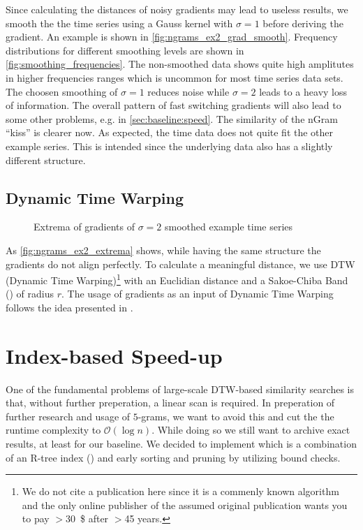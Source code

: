 Since calculating the distances of noisy gradients may lead to useless results, we smooth the the time series using a Gauss kernel with $\sigma = 1$ before deriving the gradient. An example is shown in \autoref{fig:ngrams_ex2_grad_smooth}. Frequency distributions for different smoothing levels are shown in \autoref{fig:smoothing_frequencies}. The non-smoothed data shows quite high amplitutes in higher frequencies ranges which is uncommon for most time series data sets. The choosen smoothing of $\sigma = 1$ reduces noise while $\sigma = 2$ leads to a heavy loss of information. The overall pattern of fast switching gradients will also lead to some other problems, e.g. in \autoref{sec:baseline:speed}. The similarity of the nGram \enquote{kiss} is clearer now. As expected, the time data does not quite fit the other example series. This is intended since the underlying data also has a slightly different structure.


\subsection{Dynamic Time Warping}
\label{ssec:baseline:sim:dtw}

\begin{figure}
    \centering
    
    \caption{Extrema of gradients of $\sigma = 2$ smoothed example time series}
    \label{fig:ngrams_ex2_extrema}
\end{figure}

As \autoref{fig:ngrams_ex2_extrema} shows, while having the same structure the gradients do not align perfectly. To calculate a meaningful distance, we use DTW (Dynamic Time Warping)\footnote{We do not cite a publication here since it is a commenly known algorithm and the only online publisher of the assumed original publication wants you to pay $>$\SI{30}{\$} after $>$\num{45} years.} with an Euclidian distance and a Sakoe-Chiba Band (\cite{sakoe}) of radius $r$. The usage of gradients as an input of Dynamic Time Warping follows the idea presented in \cite{DDTW}.

\section{Index-based Speed-up}
\label{sec:baseline:speed}

One of the fundamental problems of large-scale DTW-based similarity searches is that, without further preperation, a linear scan is required. In preperation of further research and usage of $5$-grams, we want to avoid this and cut the the runtime complexity to $\mathcal{O}(\log{n})$. While doing so we still want to archive exact results, at least for our baseline. We decided to implement \cite{LB_Keogh} which is a combination of an R-tree index (\cite{rtree}) and early sorting and pruning by utilizing bound checks.

